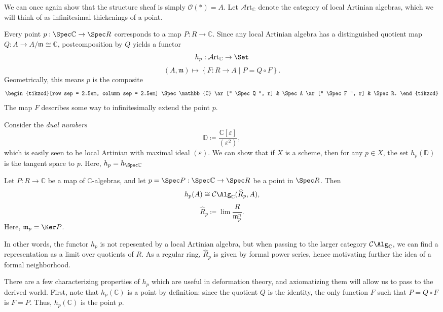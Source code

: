 We can once again show that the structure sheaf is simply $\mathcal{O} (*)=A$. Let $\mathcal{A} \mathrm{rt}_{\mathbb{C} } $ denote the category of local Artinian algebras, which we will think of as infinitesimal thickenings of a point.

Every point $p : \Spec\mathbb{C}  \to \Spec R$ corresponds to a map $P : R\to \mathbb{C} $. Since any local Artinian algebra has a distinguished quotient map $Q : A \to A/\mathfrak{m} \cong \mathbb{C} $, postcomposition by $Q$ yields a functor
\[
	h_p : \mathcal{A} \mathrm{rt}_{\mathbb{C} }  \to \Set 
\]
\[
	(A,\mathfrak{m} )\mapsto \left\{ F : R \to A \mid P=Q\circ F \right\} 
.\]
Geometrically, this means $p$ is the composite
\[\begin{tikzcd}[row sep = 2.5em, column sep = 2.5em]
\Spec\mathbb{C} \ar[" \Spec Q ", r]  & \Spec A \ar[" \Spec F ", r]  & \Spec R.
\end{tikzcd}\]
The map $F$ describes some way to infinitesimally extend the point $p$.

Consider the \emph{dual numbers}
\[
	\mathbb{D} \coloneqq \frac{\mathbb{C} [\varepsilon ]}{(\varepsilon ^2)},
\]
which is easily seen to be local Artinian with maximal ideal $(\varepsilon )$. We can show that if $X$ is a scheme, then for any $p\in X$, the set $h_p(\mathbb{D})$ is the tangent space to $p$. Here, $h_p = h_{\Spec\mathbb{C} } $

\begin{proposition}\label{prp:10-2-2}
	Let $P : R \to \mathbb{C} $ be a map of $\mathbb{C} $-algebras, and let $p=\Spec P : \Spec \mathbb{C}  \to \Spec R$ be a point in $\Spec R$. Then
	\[
		h_p(A) \cong \mathcal{C} \Alg_{\mathbb{C} } (\widehat{R}_p,A),
	\]
	\[
		\widehat{R} _p \coloneqq \lim \frac{R}{\mathfrak{m} _p^n} 
	.\]
	Here, $\mathfrak{m} _p = \Ker P$.
\end{proposition}

In other words, the functor $h_p$ is not repesented by a local Artinian algebra, but when passing to the larger category $\mathcal{C} \Alg_{\mathbb{C} } $, we can find a representation as a limit over quotients of $R$. As a regular ring, $\widehat{R}_p$ is given by formal power series, hence motivating further the idea of a formal neighborhood.

There are a few characterizing properties of $h_p$ which are useful in deformation theory, and axiomatizing them will allow us to pass to the derived world. First, note that $h_p(\mathbb{C} )$ is a point by definition: since the quotient $Q$ is the identity, the only function $F$ such that $P=Q\circ F$ is $F=P$. Thus, $h_p(\mathbb{C} )$ is the point $p$.

